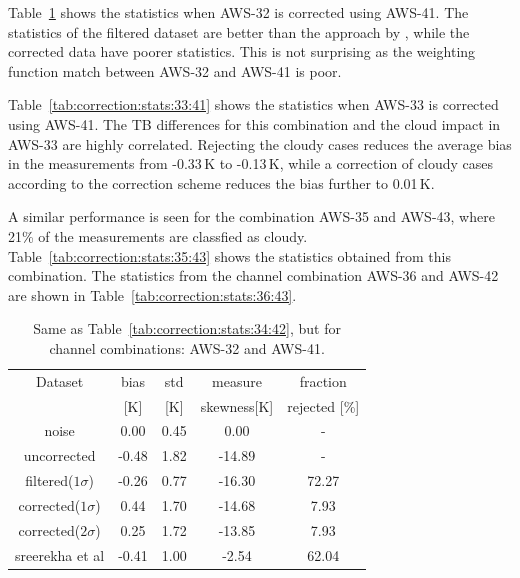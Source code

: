 \documentclass[12pt]{article}
\begin{document}
Table~\ref{tab:correction:stats:32:41} shows the statistics when AWS-32 is
corrected using AWS-41. The statistics of the filtered dataset are better than
the approach by \cite{rekha2012potential}, while the corrected data have poorer
statistics. This is not surprising as the weighting function match between 
AWS-32 and  AWS-41 is poor.

Table~\ref{tab:correction:stats:33:41} shows the statistics when AWS-33 is
corrected using AWS-41. The TB differences for this combination and the cloud
impact in AWS-33 are highly correlated. Rejecting the cloudy cases reduces the average bias in the measurements from -0.33\,K to -0.13\,K, while a correction of cloudy cases according to the correction scheme reduces the bias further to 0.01\,K.

A similar performance is seen for the combination AWS-35 and AWS-43, where 21\%
of the measurements are classfied as cloudy. Table~\ref{tab:correction:stats:35:43} shows the statistics obtained from this combination. The statistics from the channel combination AWS-36 and AWS-42 are shown in Table~\ref{tab:correction:stats:36:43}.
%
\begin{table}[!bt]
	\centering
	\begin{tabular}[b]{c|c|c|c|c}
		Dataset  		  &   bias &   std &   measure & fraction \\
							&   [K]  &   [K] & skewness[K] & rejected [\%]\\
		\hline
noise             		&   0.00 &  0.45 &               0.00 &                - \\
uncorrected       		&  -0.48 &  1.82 &             -14.89 &                - \\
filtered($1\sigma$)  	&  -0.26 &  0.77 &             -16.30 &               72.27 \\
corrected($1\sigma$) 	&   0.44 &  1.70 &             -14.68 &                7.93 \\
corrected($2\sigma$) 	&   0.25 &  1.72 &             -13.85 &                7.93 \\
sreerekha et al   		&  -0.41 &  1.00 &              -2.54 &               62.04 \\
		\hline
	\end{tabular}
	\caption{Same as Table~\ref{tab:correction:stats:34:42}, but for channel combinations: AWS-32 and AWS-41.   }
	\label{tab:correction:stats:32:41}
\end{table}
\end{document}
